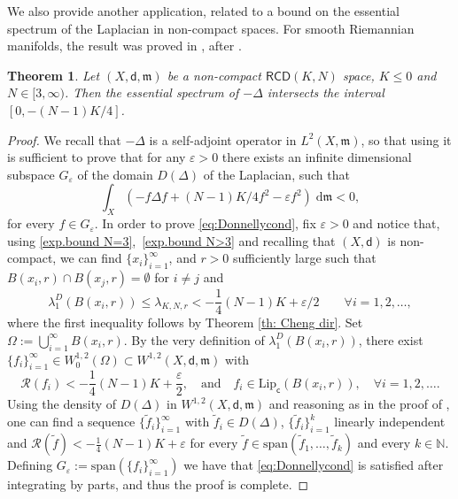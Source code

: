 \documentclass[12pt]{article}
\newcommand{\dd}{\mathrm{d}}
\newcommand{\Lip}{\mathrm{Lip}}
\newcommand{\mm}{\mathfrak m}
\newcommand{\di}{\mathsf{d}}
\theoremstyle{plain}
\newtheorem{theorem}[lemma]{Theorem}
\theoremstyle{definition}
\begin{document}
We also provide another application, related to a bound on the essential spectrum of the Laplacian in non-compact spaces. For smooth Riemannian manifolds, the result was proved in \cite[Thm. 3.1]{Donn81}, after \cite[Thm.]{cheng-bound}. 
\begin{theorem}\label{th: essspect}
 Let $(X,\di,\mm)$ be a non-compact $\mathsf{RCD}(K,N)$ space, $K\le 0$ and $N\in [3, \infty)$.  Then the essential spectrum of $-\Delta$ intersects the interval $[0,-(N-1)K/4]$.
\end{theorem}
\begin{proof}
    We recall that $-\Delta$ is a self-adjoint operator in $L^2(X,\mm)$, so that using \cite[Prop.]{Donn81} it is sufficient to prove that for any $\varepsilon>0$ there exists an infinite dimensional subspace $G_{\varepsilon}$ of the domain $D(\Delta)$ of the Laplacian, such that
  \begin{equation}\label{eq:Donnellycond}
    \int_{X}(-f\Delta f+(N-1)K/4f^2-\varepsilon f^2)\;\dd\mm<0,
   \end{equation}
    for every $f\in G_{\varepsilon}$.
    In order to prove \eqref{eq:Donnellycond},  fix $\varepsilon>0$ and notice that, using \eqref{exp.bound N=3},~\eqref{exp.bound N>3} and recalling that $(X,\di)$ is non-compact, we can find $\{x_i\}_{i=1}^{\infty}$, and $r>0$ sufficiently large such that $B(x_i,r)\cap B(x_j,r)=\emptyset$ for $i\neq j$ and
 \[
      \lambda_1^D(B(x_i,r)) \le \lambda_{K,N,r}< -\frac{1}{4}(N-1)K+\varepsilon/2 \qquad \forall i=1,2,\dots,
\]
where the first inequality follows by Theorem \ref{th: Cheng dir}. Set $\Omega:=\bigcup_{i=1}^\infty B(x_i,r)$. By the very definition of $\lambda_1^D(B(x_i,r))$, there exist $\{f_i\}_{i=1}^\infty\in W^{1,2}_0(\Omega)\subset W^{1,2}(X,\di,\mm)$ with  
%
$$\mathcal{R}(f_i)<- \frac{1}{4} (N-1) K+\frac{\varepsilon}{2}, \quad  \text{and} \quad  f_i\in \Lip_{\textsf{c}}(B(x_i,r)), \quad  \forall i=1,2,\dots.$$
%
 Using the density of $D(\Delta)$ in $W^{1,2}(X,\di,\mm)$ and reasoning as in the proof of \cite[Thm.]{GMS},
one can find a sequence $\{\tilde{f}_i\}_{i=1}^\infty$ with $\tilde{f}_i\in D(\Delta)$, $\{\tilde{f}_i\}_{i=1}^k$ linearly independent and $\mathcal{R}(\tilde{f})<  -\frac{1}{4}(N-1)K+\varepsilon$ for every $\tilde{f}\in \mathrm{span}(\tilde{f}_1,\dots,\tilde{f}_k)$ and every $k\in \mathbb{N}$. Defining $G_{\varepsilon}:=\mathrm{span}(\{f_i\}_{i=1}^\infty)$ we have that \eqref{eq:Donnellycond} is satisfied after integrating by parts, and thus the proof is complete.


\end{proof}
\end{document}
